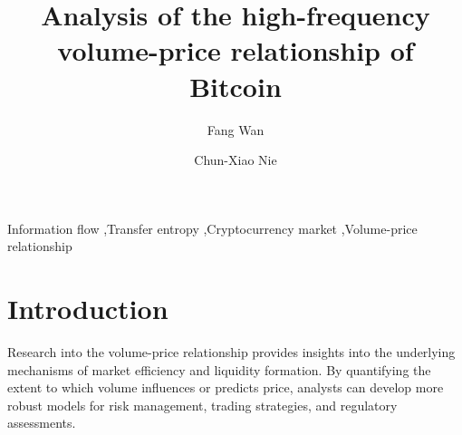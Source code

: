 \documentclass{elsarticle}
\begin{document}
\begin{frontmatter}

\title{Analysis of the high-frequency volume-price relationship of Bitcoin}

\author[mymainaddress]{Fang Wan}

\author[mymainaddress,mysecondaryaddress]{Chun-Xiao Nie}



\address[mymainaddress]{School of Statistics and Mathematics, Zhejiang Gongshang University, Hangzhou 310018, China}
\address[mysecondaryaddress]{Collaborative Innovation Center of Statistical Data Engineering, Technology \& Application, Zhejiang Gongshang University, Hangzhou, 310018, China}

\begin{abstract}

\end{abstract}

\begin{keyword}
Information flow  \sep Transfer entropy \sep Cryptocurrency market \sep Volume-price relationship
\end{keyword}

\end{frontmatter}
%
\linenumbers

\section{Introduction}
Research into the volume-price relationship provides insights into the underlying mechanisms of market efficiency and liquidity formation. By quantifying the extent to which volume influences or predicts price, analysts can develop more robust models for risk management, trading strategies, and regulatory assessments.
\end{document}
